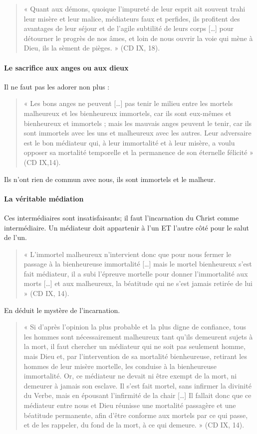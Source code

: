 \begin{quote}
    « Quant aux démons, quoique l’impureté de leur esprit ait souvent trahi leur misère et leur malice,
médiateurs faux et perfides, ils profitent des avantages de leur séjour et de l’agile subtilité de leurs
corps […] pour détourner le progrès de nos âmes, et loin de nous ouvrir la voie qui mène à Dieu, ils la
sèment de pièges. » (CD IX, 18).
\end{quote}





 \paragraph{Le sacrifice aux anges ou aux dieux} Il ne faut pas les adorer non plus  :  
 \begin{quote}
    « Les bons anges ne peuvent […] pas tenir le milieu entre les mortels malheureux et les bienheureux
immortels, car ils sont eux-mêmes et bienheureux et immortels ; mais les mauvais anges peuvent le
tenir, car ils sont immortels avec les uns et malheureux avec les autres. Leur adversaire est le bon
médiateur qui, à leur immortalité et à leur misère, a voulu opposer sa mortalité temporelle et la
permanence de son éternelle félicité » (CD IX,14).
\end{quote}
Ils n'ont rien de commun avec nous, ils sont immortels et le malheur.
 
 \paragraph{La véritable médiation} Ces intermédiaires sont insatisfaisants; il faut l'incarnation du Christ comme intermédiaire. Un médiateur doit appartenir à l'un ET l'autre côté pour le salut de l'un.
 
\begin{quote}
« L’immortel malheureux  n’intervient donc que pour nous fermer le passage à la bienheureuse
immortalité […] mais le mortel bienheureux s’est fait médiateur, il a subi l’épreuve mortelle pour
donner l’immortalité aux morts […] et aux malheureux, la béatitude qui ne s’est jamais retirée de lui »
(CD IX, 14).
\end{quote}
En déduit le mystère de l'incarnation.


\begin{quote}
    « Si d’après l’opinion la plus probable et la plus digne de confiance, tous les hommes sont
nécessairement malheureux tant qu’ils demeurent sujets à la mort, il faut chercher un médiateur qui ne
soit pas seulement homme, mais Dieu et, par l’intervention de sa mortalité bienheureuse, retirant les
hommes de leur misère mortelle, les conduise à la bienheureuse immortalité. Or, ce médiateur ne
devait ni être exempt de la mort, ni demeurer à jamais son esclave. Il s’est fait mortel, sans infirmer la
divinité du Verbe, mais en épousant l’infirmité de la chair […] Il fallait donc que ce médiateur entre
nous et Dieu réunisse une mortalité passagère et une béatitude permanente, afin d’être conforme aux
mortels par ce qui passe, et de les rappeler, du fond de la mort, à ce qui demeure. » (CD IX, 14).
\end{quote}

